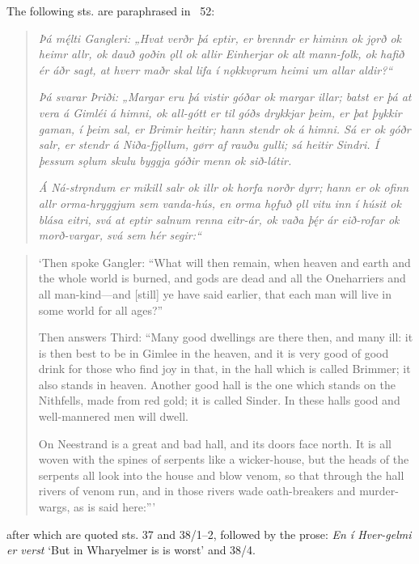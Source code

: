 {\small The following sts. are paraphrased in \Gylfaginning\ 52:

\begin{quote}
	\emph{Þá mę́lti Gangleri: „Hvat verðr þá eptir, er brenndr er himinn ok jǫrð ok heimr allr, ok dauð goðin ǫll ok allir Einherjar ok alt mann-folk, ok hafið ér áðr sagt, at hverr maðr skal lifa í nǫkkvǫrum heimi um allar aldir?“}

	\emph{Þá svarar Þriði: „Margar eru þá vistir góðar ok margar illar; batst er þá at vera á Gimléi á himni, ok all-gótt er til góðs drykkjar þeim, er þat þykkir gaman, í þeim sal, er Brimir heitir; hann stendr ok á himni. Sá er ok góðr salr, er stendr á Niða-fjǫllum, gørr af rauðu gulli; sá heitir Sindri. Í þessum sǫlum skulu byggja góðir menn ok sið-látir.}

	\emph{Á Ná-strǫndum er mikill salr ok illr ok horfa norðr dyrr; hann er ok ofinn allr orma-hryggjum sem vanda-hús, en orma hǫfuð ǫll vitu inn í húsit ok blása eitri, svá at eptir salnum renna eitr-ár, ok vaða þę́r ár eið-rofar ok morð-vargar, svá sem hér segir:“}
\end{quote}

\begin{quote}
	‘Then spoke Gangler: “What will then remain, when heaven and earth and the whole world is burned, and gods are dead and all the Oneharriers and all man-kind—and [still] ye have said earlier, that each man will live in some world for all ages?”

	Then answers Third: “Many good dwellings are there then, and many ill: it is then best to be in Gimlee in the heaven, and it is very good of good drink for those who find joy in that, in the hall which is called Brimmer; it also stands in heaven. Another good hall is the one which stands on the Nithfells, made from red gold; it is called Sinder. In these halls good and well-mannered men will dwell.

	On Neestrand is a great and bad hall, and its doors face north. It is all woven with the spines of serpents like a wicker-house, but the heads of the serpents all look into the house and blow venom, so that through the hall rivers of venom run, and in those rivers wade oath-breakers and murder-wargs, as is said here:”’
\end{quote}

after which are quoted sts. 37 and 38/1–2, followed by the prose: \emph{En í Hver-gelmi er verst} ‘But in Wharyelmer is is worst’ and 38/4.}

\sectionline

